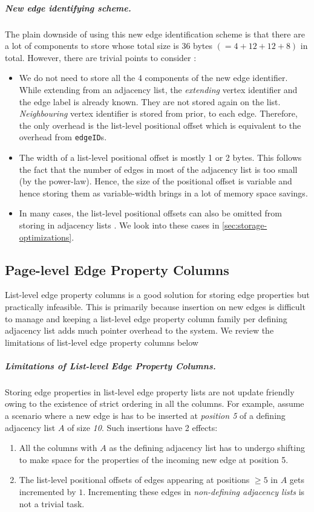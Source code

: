 \vspace{-12pt}
\subparagraph{New edge identifying scheme.} The plain downside of using this new edge identification scheme is that there are a lot of components to store whose total size is 36 bytes $(=4+12+12+8)$ in total. However, there are trivial points to consider : 
\begin{itemize}
	\item We do not need to store all the 4 components of the new edge identifier. While extending from an adjacency list, the \emph{extending} vertex identifier and the edge label is already known. They are not stored again on the list. \emph{Neighbouring} vertex identifier is stored from prior, to each edge. Therefore, the only overhead is the list-level positional offset which is equivalent to the overhead from \texttt{edgeID}s.
	\item The width of a list-level positional offset is mostly 1 or 2 bytes. This follows the fact that the number of edges in most of the adjacency list is too small (by the power-law). Hence, the size of the positional offset is variable and hence storing them as variable-width brings in a lot of memory space savings.
	\item In many cases, the list-level positional offsets can also be omitted from storing in adjacency lists . We look into these cases in \ref{sec:storage-optimizations}.
\end{itemize}

\subsection{Page-level Edge Property Columns}

List-level edge property columns is a good solution for storing edge properties but practically infeasible. This is primarily because insertion on new edges is difficult to manage and keeping a list-level edge property column family per defining adjacency list adds much pointer overhead to the system. We review the limitations of list-level edge property columns below


\vspace{-12pt}
\subparagraph{Limitations of List-level Edge Property Columns.}
Storing edge properties in list-level edge property lists are not update friendly owing to the existence of strict ordering in all the columns. For example, assume a scenario where a new edge is has to be inserted at \emph{position 5} of a defining adjacency list $A$ of size \emph{10}. Such insertions have 2 effects: 
\begin{enumerate}
	\item All the columns with $A$ as the defining adjacency list has to undergo shifting to make space for the properties of the incoming new edge at position 5.
	\item The list-level positional offsets of edges appearing at positions $\geq 5$ in $A$ gets incremented by $1$. Incrementing these edges in \emph{non-defining adjacency lists} is not a trivial task.  
\end{enumerate}

